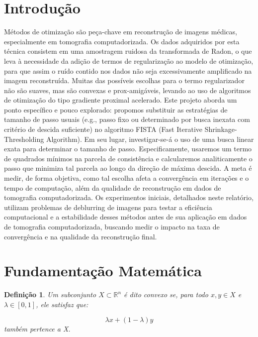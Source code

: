 \documentclass[12pt]{article}
\newtheorem{definition}{Definição}
\begin{document}
\newpage
\tableofcontents
\newpage

\section{Introdução}

Métodos de otimização são peça-chave em reconstrução de imagens médicas, especialmente em tomografia computadorizada. Os dados adquiridos por esta técnica consistem em uma amostragem ruidosa da transformada de Radon, o que leva à necessidade da adição de termos de regularização ao modelo de otimização, para que assim o ruído contido nos dados não seja excessivamente amplificado na imagem reconstruída. Muitas das possíveis escolhas para o termo regularizador não são suaves, mas são convexas e prox-amigáveis, levando ao uso de algoritmos de otimização do tipo gradiente proximal acelerado. Este projeto aborda um ponto específico e pouco explorado: propomos substituir as estratégias de tamanho de passo usuais (e.g., passo fixo ou determinado por busca inexata com critério de descida suficiente) no algoritmo FISTA (Fast Iterative Shrinkage-Thresholding Algorithm). Em seu lugar, investigar-se-á o uso de uma busca linear exata para determinar o tamanho de passo. Especificamente, usaremos um termo de quadrados mínimos na parcela de consistência e calcularemos analiticamente o passo que minimiza tal parcela ao longo da direção de máxima descida. A meta é medir, de forma objetiva, como tal escolha afeta a convergência em iterações e o tempo de computação, além da qualidade de reconstrução em dados de tomografia computadorizada.
Os experimentos iniciais, detalhados neste relatório, utilizam problemas de deblurring de imagens para testar a eficiência computacional e a estabilidade desses métodos antes de sua aplicação em dados de tomografia computadorizada, buscando medir o impacto na taxa de convergência e na qualidade da reconstrução final.

\section{Fundamentação Matemática}

\begin{definition}
Um subconjunto $X \subset \mathbb{R}^n$ é dito convexo se, para todo $x, y \in X$ e $\lambda \in [0,1]$, ele satisfaz que:

\[
\lambda x + ( 1 - \lambda ) y
\] também pertence a X.
\end{definition}
\end{document}
